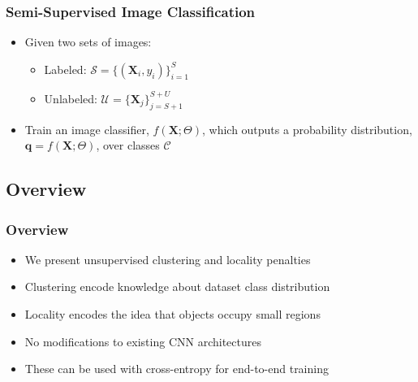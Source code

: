 \begin{frame}
	\frametitle{Semi-Supervised Image Classification}
	\begin{itemize}
		\item Given two sets of images:
			\begin{itemize}
				\setlength\itemsep{0.5em}
				\item Labeled: $\mathcal{S} = \{(\mathbf{X}_i, y_i)\}_{i=1}^S$\\
				\item Unlabeled: $\mathcal{U} = \{\mathbf{X}_j\}_{j=S+1}^{S+U}$
			\end{itemize}
		\item Train an image classifier, $f(\mathbf{X};\Theta)$, which
			outputs a probability distribution, $\mathbf{q} = f(\mathbf{X}; \Theta)$, over classes $\mathcal{C}$
	\end{itemize}
\end{frame}

\subsection{Overview}
\begin{frame}
	\frametitle{Overview}
	\begin{itemize}
		\item We present unsupervised clustering and locality penalties
		\item Clustering encode knowledge about dataset class distribution
		\item Locality encodes the idea that objects occupy small regions
		\item No modifications to existing CNN architectures
		\item These can be used with cross-entropy for end-to-end training
	\end{itemize}
\end{frame}

